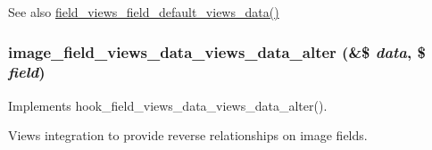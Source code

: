 \begin{DoxySeeAlso}{See also}
\hyperlink{field_8views_8inc_adbb71dc4cb1642151e243f305ba34223}{field\_\-views\_\-field\_\-default\_\-views\_\-data()} 
\end{DoxySeeAlso}
\hypertarget{image_8views_8inc_a6a573e59d074618f557734255bd235b8}{
\subsubsection[{image\_\-field\_\-views\_\-data\_\-views\_\-data\_\-alter}]{\setlength{\rightskip}{0pt plus 5cm}image\_\-field\_\-views\_\-data\_\-views\_\-data\_\-alter (\&\$ {\em data}, \/  \$ {\em field})}}
\label{image_8views_8inc_a6a573e59d074618f557734255bd235b8}
Implements hook\_\-field\_\-views\_\-data\_\-views\_\-data\_\-alter().

Views integration to provide reverse relationships on image fields. 